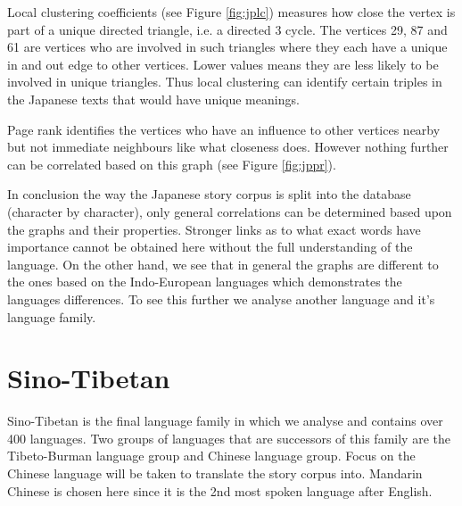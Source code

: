 Local clustering coefficients (see Figure \ref{fig:jplc}) measures how close the vertex is part of a unique directed triangle, i.e. a directed 3 cycle. The vertices 29, 87 and 61 are vertices who are involved in such triangles where they each have a unique in and out edge to other vertices. Lower values means they are less likely to be involved in unique triangles. Thus local clustering can identify certain triples in the Japanese texts that would have unique meanings. 

Page rank identifies the vertices who have an influence to other vertices nearby but not immediate neighbours like what closeness does. However nothing further can be correlated based on this graph (see Figure \ref{fig:jppr}).

In conclusion the way the Japanese story corpus is split into the database (character by character), only general correlations can be determined based upon the graphs and their properties. Stronger links as to what exact words have importance cannot be obtained here without the full understanding of the language. On the other hand, we see that in general the graphs are different to the ones based on the Indo-European languages which demonstrates the languages differences. To see this further we analyse another language and it's language family.

\section{Sino-Tibetan}
Sino-Tibetan is the final language family in which we analyse and contains over 400 languages. Two groups of languages that are successors of this family are the Tibeto-Burman language group and Chinese language group. Focus on the Chinese language will be taken to translate the story corpus into. Mandarin Chinese is chosen here since it is the 2nd most spoken language after English.

